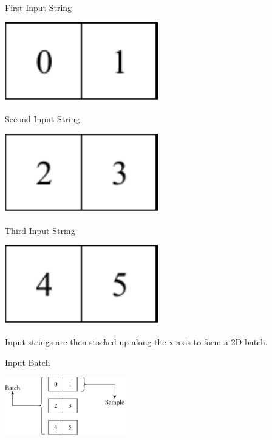 \documentclass[12pt]{article}
\newcommand\tab[1][1cm]{\hspace*{#1}}
\begin{document}
\begin{tcbraster}[raster columns=3,raster rows=3,
	enhanced,size=small,fit algorithm=hybrid* ]
	\begin{inlinefigure}{First Input String}
		\begin{center}
			\includegraphics[width=0.5\textwidth]{input1}
		\end{center}
	\end{inlinefigure}
	\begin{inlinefigure}{Second Input String}
		\begin{center}
			\includegraphics[width=0.5\textwidth]{input2}
		\end{center}
	\end{inlinefigure}
	\begin{inlinefigure}{Third Input String}
		\begin{center}
			\includegraphics[width=0.5\textwidth]{input3}
		\end{center}
	\end{inlinefigure}
\end{tcbraster}
\tab Input strings are then stacked up along the x-axis to form a 2D batch.
\begin{blockfigure}{Input Batch}
	\begin{center}
		\includegraphics[width=0.4\textwidth]{input_final}
	\end{center}
\end{blockfigure}\\
\end{document}
